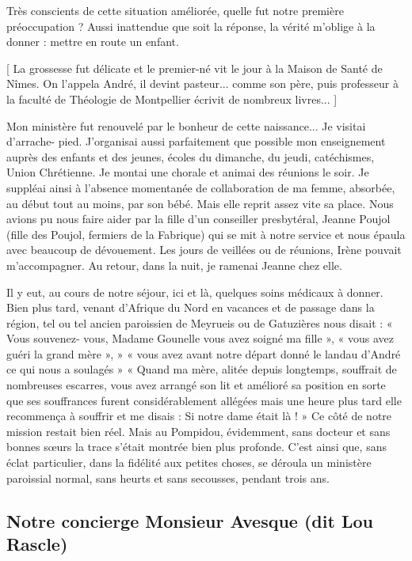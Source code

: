 Très conscients de cette situation améliorée, quelle fut notre première préoccupation ?
Aussi inattendue que soit la réponse, la vérité m’oblige à la donner : mettre en route
un enfant.

[ La grossesse fut délicate et le premier-né vit le jour à la Maison de Santé de Nîmes. On l’appela
André, il devint pasteur... comme son père, puis professeur à la faculté de Théologie de Montpellier
écrivit de nombreux livres... ]

Mon ministère fut renouvelé par le bonheur de cette naissance... Je visitai d’arrache-
pied. J’organisai aussi parfaitement que possible mon enseignement auprès des
enfants et des jeunes, écoles du dimanche, du jeudi, catéchismes, Union Chrétienne.
Je montai une chorale et animai des réunions le soir. Je suppléai ainsi à l’absence
momentanée de collaboration de ma femme, absorbée, au début tout au moins, par
son bébé. Mais elle reprit assez vite sa place. Nous avions pu nous faire aider par la
fille d’un conseiller presbytéral, Jeanne Poujol (fille des Poujol, fermiers de la Fabrique) qui se mit à notre service et nous épaula avec beaucoup de dévouement. Les jours de
veillées ou de réunions, Irène pouvait m’accompagner. Au retour, dans la nuit, je
ramenai Jeanne chez elle.

Il y eut, au cours de notre séjour, ici et là, quelques soins médicaux à donner. Bien
plus tard, venant d’Afrique du Nord en vacances et de passage dans la région, tel ou
tel ancien paroissien de Meyrueis ou de Gatuzières nous disait : « Vous souvenez-
vous, Madame Gounelle vous avez soigné ma fille », « vous avez guéri la grand
mère », » « vous avez avant notre départ donné le landau d’André ce qui nous a
soulagés » « Quand ma mère, alitée depuis longtemps, souffrait de nombreuses
escarres, vous avez arrangé son lit et amélioré sa position en sorte que ses
souffrances furent considérablement allégées mais une heure plus tard elle
recommença à souffrir et me disais : Si notre dame était là ! »
Ce côté de notre mission restait bien réel. Mais au Pompidou, évidemment, sans
docteur et sans bonnes sœurs la trace s’était montrée bien plus profonde.
C’est ainsi que, sans éclat particulier, dans la fidélité aux petites choses, se déroula un
ministère paroissial normal, sans heurts et sans secousses, pendant trois ans.

\subsection{Notre concierge Monsieur Avesque (dit Lou Rascle)}

